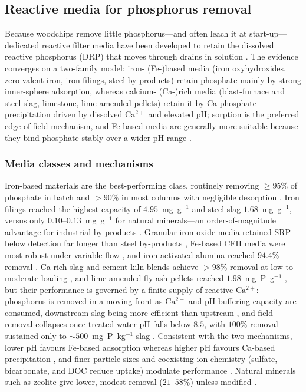 \subsection{Reactive media for phosphorus removal}

Because woodchips remove little phosphorus---and often leach it at
start-up---dedicated reactive filter media have been developed to retain the
dissolved reactive phosphorus (DRP) that moves through drains in solution
\parencite{Christianson2021}. The evidence converges on a two-family model:
iron- (Fe-)based media (iron oxyhydroxides, zero-valent iron, iron filings,
steel by-products) retain phosphate mainly by strong inner-sphere adsorption,
whereas calcium- (Ca-)rich media (blast-furnace and steel slag, limestone,
lime-amended pellets) retain it by Ca-phosphate precipitation driven by
dissolved $\mathrm{Ca^{2+}}$ and elevated pH; sorption is the preferred
edge-of-field mechanism, and Fe-based media are generally more suitable
because they bind phosphate stably over a wider pH range
\parencite{Mendes2022,Li2020}.

\subsubsection{Media classes and mechanisms}

Iron-based materials are the best-performing class, routinely removing
$\geq95\%$ of phosphate in batch and $>90\%$ in most columns with negligible
desorption \parencite{Allred2014,Allred2012,Allred2017,Mendes2022}. Iron
filings reached the highest capacity of $4.95$~mg~g$^{-1}$ and steel slag
$1.68$~mg~g$^{-1}$, versus only $0.10$--$0.13$~mg~g$^{-1}$ for natural
minerals---an order-of-magnitude advantage for industrial by-products
\parencite{Sellner2019b}. Granular iron-oxide media retained SRP below
detection far longer than steel by-products \parencite{Hauda2020}, Fe-based
CFH media were most robust under variable flow \parencite{Pugliese2023}, and
iron-activated alumina reached $94.4\%$ removal \parencite{Kumari2025}. Ca-rich
slag and cement-kiln blends achieve $>98\%$ removal at low-to-moderate
loading \parencite{Agrawal2011,Sanford2016}, and lime-amended fly-ash pellets
reached $1.98$~mg~P~g$^{-1}$ \parencite{Li2017}, but their performance is
governed by a finite supply of reactive $\mathrm{Ca^{2+}}$: phosphorus is
removed in a moving front as $\mathrm{Ca^{2+}}$ and pH-buffering capacity are
consumed, downstream slag being more efficient than upstream
\parencite{Wang2020d}, and field removal collapses once treated-water pH falls
below $8.5$, with $100\%$ removal sustained only to $\sim500$~mg~P~kg$^{-1}$
slag \parencite{Penn2020}. Consistent with the two mechanisms, lower pH favours
Fe-based adsorption whereas higher pH favours Ca-based precipitation
\parencite{Mendes2022}, and finer particle sizes and coexisting-ion chemistry
(sulfate, bicarbonate, and DOC reduce uptake) modulate performance
\parencite{Li2020,Sellner2019b,Pugliese2023}. Natural minerals such as zeolite
give lower, modest removal ($21$--$58\%$) unless modified \parencite{Agrawal2011,Sadeghi2021}.

